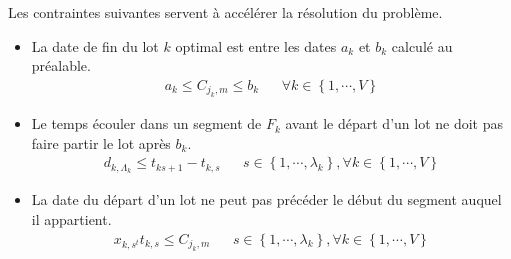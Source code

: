 Les contraintes suivantes servent à accélérer la résolution du problème.
\begin{itemize}
	\item 
		La date de fin du lot $k$ optimal est entre les dates $a_k$ et $b_k$ calculé au préalable.
		\begin{align}
			a_k \leq C_{j_k, m} \leq b_k && \forall k \in \left\{1,\cdots,V\right\}
		\end{align}
	\item 
		Le temps écouler dans un segment de $F_k$ avant le départ d'un lot ne doit pas faire partir le lot après $b_k$.
		\begin{align}
			d_{k, \Lambda_k} \leq t_{k s+1} - t_{k, s}&& s \in \left\{1,\cdots,\lambda_k\right\}, \forall k \in \left\{1,\cdots,V\right\}
		\end{align}
	\item 
		La date du départ d'un lot ne peut pas précéder le début du segment auquel il appartient.
		\begin{align}
			x_{k, s^t} t_{k, s} \leq C_{j_k, m} && s \in \left\{1,\cdots,\lambda_k\right\}, \forall k \in \left\{1,\cdots,V\right\}
		\end{align}
\end{itemize}
